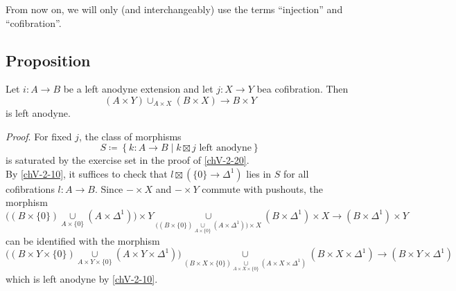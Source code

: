         From now on, we will only (and interchangeably) use the terms ``injection'' and ``cofibration''.

    \subsection{Proposition}\label{chV-2-22}
        Let $i \colon A \to B$ be a left anodyne extension and let $j \colon X \to Y$ bea cofibration. Then
        \begin{equation*}
            (A \times Y) \cup_{A \times X} (B \times X) \to B \times Y
        \end{equation*}
        is left anodyne.
        \smallskip

        \emph{Proof}. For fixed $j$, the class of morphisms
        \begin{equation*}
            S \coloneq \left\{ k \colon A \to B \mid k \boxtimes j \text{ left anodyne} \right\}
        \end{equation*}
        is saturated by the exercise set in the proof of \ref{chV-2-20}.\\
        By \ref{chV-2-10}, it suffices to check that $l \boxtimes (\{0\} \to \Delta^1)$ lies in $S$ for all cofibrations $l \colon A \to B$. Since $- \times X$ and $- \times Y$ commute with pushouts, the morphism
        \begin{equation*}
            \Big((B \times \{0\}) \underset{A \times \{0\}}{\cup} (A \times \Delta^1)\Big) \times Y \underset{\big((B \times \{0\}) \underset{A \times \{0\}}{\cup} (A \times \Delta^1)\big) \times X}{\cup} (B \times \Delta^1) \times X \to (B \times \Delta^1) \times Y
        \end{equation*}
        can be identified with the morphism
        \begin{equation*}
            \Big((B \times Y \times \{0\}) \underset{A \times Y \times \{0\}}{\cup} (A \times Y \times \Delta^1)\Big) \underset{(B \times X \times \{0\}) \underset{A \times X \times \{0\}}{\cup} (A \times X \times \Delta^1)}{\cup} (B \times X \times \Delta^1) \to (B \times Y \times \Delta^1)
        \end{equation*}
        which is left anodyne by \ref{chV-2-10}.

